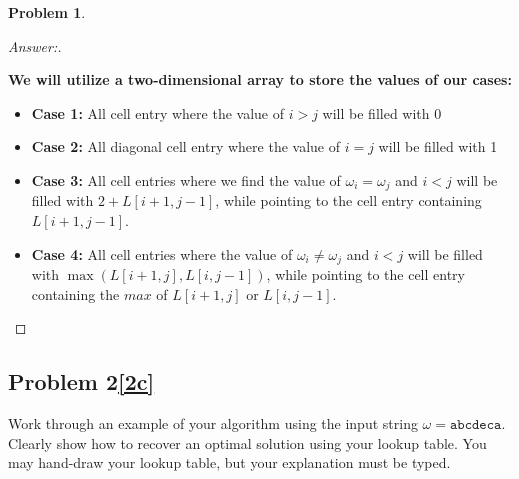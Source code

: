 \documentclass[11pt]{article}
\theoremstyle{definition}
\theoremstyle{definition}
\newtheorem{required}{Problem}
\theoremstyle{definition}
\begin{document}
\begin{required}
\begin{enumerate}[label=(\alph*)]
\begin{proof}[Answer:] \
\item \textbf{We will utilize a two-dimensional array to store the values of our cases:}
\begin{itemize}
\item \textbf{Case 1:} All cell entry where the value of $i > j$ will be filled with 0
\item \textbf{Case 2:} All diagonal cell entry where the value of $i = j$ will be filled with 1
\item \textbf{Case 3:} All cell entries where we find the value of $\omega_i = \omega_j$ and $i < j$ will be filled with $2 + L[i + 1, j - 1]$, while pointing to the cell entry containing $L[i + 1, j - 1]$.
\item \textbf{Case 4:} All cell entries where the value of $\omega_i \neq \omega_j$ and $i < j$ will be filled with $\max(L[i + 1, j], L[i, j - 1])$, while pointing to the cell entry containing the $max$ of $L[i + 1, j]$ or $L[i, j - 1]$.
\end{itemize}
\end{proof}



\newpage
\subsection{Problem 2\ref{2c}}
\item \label{2c} Work through an example of your algorithm using the input string $\omega = \texttt{abcdeca}$. Clearly show how to recover an optimal solution using your lookup table. You may hand-draw your lookup table, but your explanation must be typed.


\end{enumerate}
\end{required}
\end{document}

